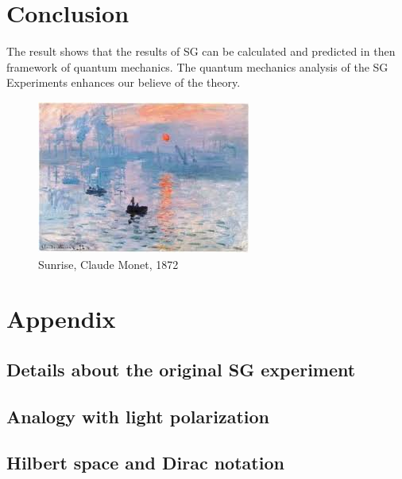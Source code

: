 \documentclass[a4paper]{article}
\begin{document}
\section {Conclusion}
The result shows that the results of SG can be calculated and predicted in then
framework of quantum mechanics. The quantum mechanics analysis of the SG Experiments
enhances our believe of the theory.




\begin{figure}[htbp!] \label{sunrise}
\centering %
    \includegraphics[width=0.8\linewidth]{sunrise.jpg}
    \caption{Sunrise, Claude Monet, 1872}
\end{figure}
\section{Appendix}
\subsection{Details about the original SG experiment}
\subsection{Analogy with light polarization}
\subsection{Hilbert space and Dirac notation}



  
\end{document}
